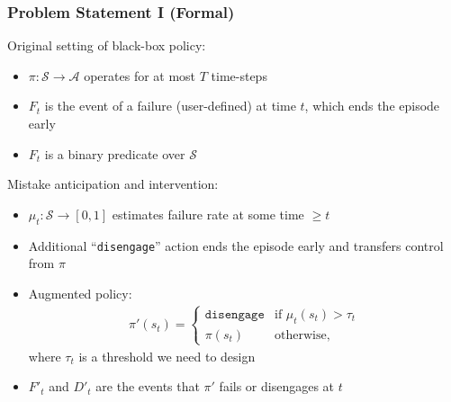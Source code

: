 \documentclass[handout]{beamer}
\begin{document}
\begin{frame}
    \frametitle{Problem Statement I (Formal)}
    Original setting of black-box policy:
        \begin{itemize}
        \item $\pi: \mathcal{S} \rightarrow \mathcal{A}$ operates for at most $T$ time-steps
        \item $F_t$ is the event of a failure (user-defined) at time $t$, which ends the episode early
        \item $F_t$ is a binary predicate over $\mathcal{S}$
        \end{itemize}
    Mistake anticipation and intervention:
        \begin{itemize}
        \item $\mu_t: \mathcal{S} \rightarrow [0,1]$ estimates failure rate at some time $\geq t$
        \item Additional ``\texttt{disengage}'' action ends the episode early and transfers control from $\pi$
        \item Augmented policy:
        \begin{align}
            \pi'(s_t) = \begin{cases}
                \texttt{disengage} & \text{if } \mu_t(s_t) > \tau_t \\
                \pi(s_t) & \text{otherwise,}
            \end{cases}
        \end{align}
        where $\tau_t$ is a threshold we need to design
        \item $F'_t$ and $D'_t$ are the events that $\pi'$ fails or disengages at $t$
        \end{itemize}
\end{frame}
\end{document}
